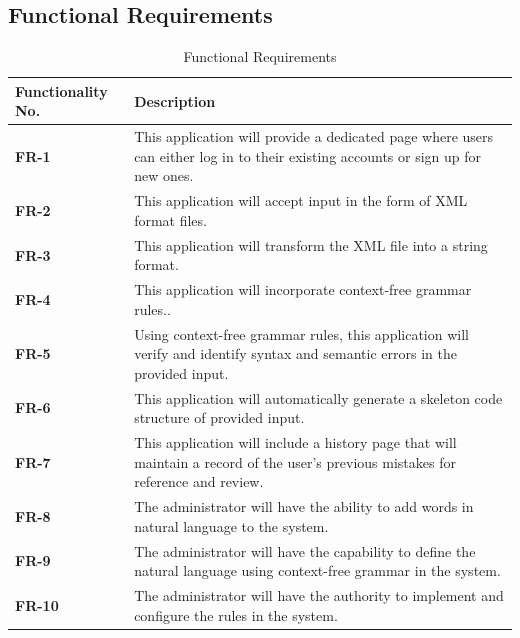 \documentclass[12pt,a4paper]{article}
\begin{document}
\newpage
\subsection{Functional Requirements}
\begin{table}[h!]
\caption{Functional Requirements}
    \centering
    \begin{tabular}{|l|p{7cm}|}
    \hline
       \textbf{Functionality No.}&\textbf{Description} \\ %
       \hline
       \textbf{FR-1}&
      This application will provide a dedicated page where users can either log in to their existing accounts or sign up for new ones.\\ %
       \hline
       \textbf{FR-2}&
        This application will accept input in the form of XML format files.\\ %
       \hline
       \textbf{FR-3}&
        This application will transform the XML file into a string format.\\ %
       \hline
       \textbf{FR-4}&
        This application will incorporate context-free grammar rules..\\ %
       \hline
       \textbf{FR-5}&
        Using context-free grammar rules, this application will verify and identify syntax and semantic errors in the provided input.\\ %
       \hline
       \textbf{FR-6}&
        This application will automatically generate a skeleton code structure of provided input.\\ %
       \hline
       \textbf{FR-7}&
        This application will include a history page that will maintain a record of the user's previous mistakes for reference and review.\\ %
       \hline
       \textbf{FR-8}&
       The administrator will have the ability to add words in natural language to the system.\\ %
       \hline
       \textbf{FR-9}&
        The administrator will have the capability to define the natural language using context-free grammar in the system.\\ %
       \hline
       \textbf{FR-10}&
       The administrator will have the authority to implement and configure the rules in the system.\\ %
       \hline   
    \end{tabular}
\end{table}
\end{document}
